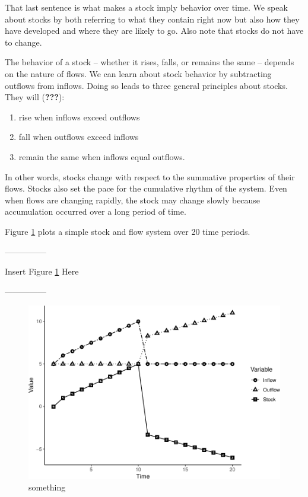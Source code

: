 \documentclass[english,,man]{apa6}
\providecommand{\tightlist}{%
  \setlength{\itemsep}{0pt}\setlength{\parskip}{0pt}}
\theoremstyle{definition}
\theoremstyle{definition}
\theoremstyle{definition}
\theoremstyle{remark}
\begin{document}
\noindent That last sentence is what makes a stock imply behavior over
time. We speak about stocks by both referring to what they contain right
now but also how they have developed and where they are likely to go.
Also note that stocks do not have to change.

The behavior of a stock -- whether it rises, falls, or remains the same
-- depends on the nature of flows. We can learn about stock behavior by
subtracting outflows from inflows. Doing so leads to three general
principles about stocks. They will ({\textbf{???}}):

\begin{enumerate}
\def\labelenumi{\arabic{enumi}.}
\tightlist
\item
  rise when inflows exceed outflows
\item
  fall when outflows exceed inflows
\item
  remain the same when inflows equal outflows.
\end{enumerate}

\noindent In other words, stocks change with respect to the summative
properties of their flows. Stocks also set the pace for the cumulative
rhythm of the system. Even when flows are changing rapidly, the stock
may change slowly because accumulation occurred over a long period of
time.

Figure \ref{stocks} plots a simple stock and flow system over 20 time
periods.

\begin{center}

---------------

Insert Figure \ref{stocks} Here

---------------

\end{center}

\begin{figure}
\centering
\includegraphics{figs/unnamed-chunk-5-1.pdf}
\caption{\label{fig:unnamed-chunk-5}something\label{stocks}}
\end{figure}
\end{document}
